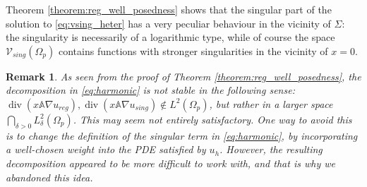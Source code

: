 \documentclass[report]{elsarticle}
\newtheorem{remark}[theorem]{Remark}
\numberwithin{theorem}{section}
\begin{document}
Theorem \ref{theorem:reg_well_posedness} shows that the singular part of the solution to \eqref{eq:vsing_heter} has a very peculiar behaviour in the vicinity of $\Sigma$: the singularity is necessarily of a logarithmic type, while of course the space $\mathcal{V}_{sing}(\Omega_p)$ contains functions with stronger singularities in the vicinity of $x=0$.%
\begin{remark}
	As seen from the proof of Theorem \ref{theorem:reg_well_posedness}, the decomposition in \eqref{eq:harmonic} is not stable in the following sense: $\operatorname{div}( x \mathbb{A}\nabla u_{reg}), \operatorname{div}( x \mathbb{A}\nabla u_{sing})\notin L^2(\Omega_p)$, but rather in a larger space $\bigcap_{\delta>0}L^2_{\delta}(\Omega_p)$. This may seem not entirely satisfactory. One way to avoid this is to change the definition of the singular term in \eqref{eq:harmonic}, by incorporating a well-chosen weight into the PDE satisfied by $u_h$. However, the resulting decomposition appeared to be more difficult to work with, and that is why we abandoned this idea.

\end{remark}
\end{document}
